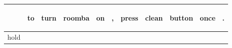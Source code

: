\documentclass[landscape]{article}
\newcommand{\ssp}{\hspace{2pt}}
\begin{document}
\newpage

\noindent\begin{tabular}{|l|p{10pt}|p{10pt}|p{10pt}|p{10pt}|p{10pt}|p{10pt}|p{10pt}|p{10pt}|p{10pt}|p{10pt}|}
\hline
&\begin{sideways}\cellcolor{ref0}to\hspace{12pt}\end{sideways}&\begin{sideways}\cellcolor{ref1}turn\hspace{12pt}\end{sideways}&\begin{sideways}\cellcolor{ref2}roomba\hspace{12pt}\end{sideways}&\begin{sideways}\cellcolor{ref3}on\hspace{12pt}\end{sideways}&\begin{sideways}\cellcolor{ref4},\hspace{12pt}\end{sideways}&\begin{sideways}\cellcolor{ref5}press\hspace{12pt}\end{sideways}&\begin{sideways}\cellcolor{ref6}clean\hspace{12pt}\end{sideways}&\begin{sideways}\cellcolor{ref7}button\hspace{12pt}\end{sideways}&\begin{sideways}\cellcolor{ref8}once\hspace{12pt}\end{sideways}&\begin{sideways}\cellcolor{ref9}.\hspace{12pt}\end{sideways}\\
\hline
\ssp hold \ssp&\hspace{2pt}&\hspace{2pt}&\hspace{2pt}&\hspace{2pt}&\hspace{2pt}&\hspace{2pt}&\hspace{2pt}&\hspace{2pt}&\hspace{2pt}&\hspace{2pt}\\

\end{tabular}
\end{document}
